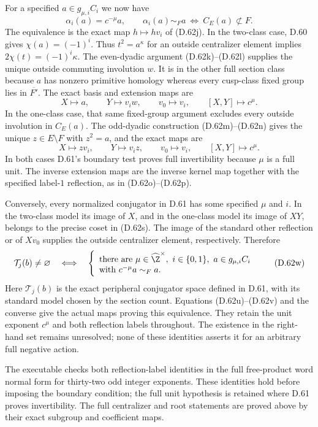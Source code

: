 For a specified $a\in g_{\mu,i}C_i$ we now have
\[
 \alpha_i(a)=c^{-\mu}a,\qquad
 \alpha_i(a)\sim_F a
       \ \Longleftrightarrow\
                 C_E(a)\not\subset F.                  \tag{D.62t}
\]
The equivalence is the exact map $h\mapsto hv_i$
of (D.62j). In the two-class case, D.60 gives
$\chi(a)=(-1)^i$. Thus $t^2=a^\kappa$ for an
outside centralizer element implies
$2\chi(t)=(-1)^i\kappa$.
The even-dyadic argument (D.62k)--(D.62l) supplies
the unique outside commuting involution $w$.
It is in the other full section class because
$a$ has nonzero primitive homology whereas
every cusp-class fixed group lies in
$\overline{F'}$. The exact basis and extension maps are
\[
 X\longmapsto a,\qquad Y\longmapsto v_iw,\qquad
 v_0\longmapsto v_i,\qquad [X,Y]\longmapsto c^\mu.
                                                        \tag{D.62u}
\]
In the one-class case, that same fixed-group
argument excludes every outside involution in
$C_E(a)$. The odd-dyadic construction
(D.62m)--(D.62n) gives the unique $z\in E\setminus F$
with $z^2=a$, and the exact maps are
\[
 X\longmapsto zv_i,\qquad Y\longmapsto v_i z,\qquad
 v_0\longmapsto v_i,\qquad [X,Y]\longmapsto c^\mu.
                                                        \tag{D.62v}
\]
In both cases D.61's boundary test proves full
invertibility because $\mu$ is a full unit.
The inverse extension maps are the inverse kernel
map together with the specified label-$1$ reflection,
as in (D.62o)--(D.62p).

Conversely, every normalized conjugator in D.61
has some specified $\mu$ and $i$. In the two-class
model its image of $X$, and in the one-class model
its image of $XY$, belongs to the precise coset
in (D.62s). The image of the standard other
reflection or of $Xv_0$ supplies the outside
centralizer element, respectively. Therefore
\[
 \mathcal T_j(b)\ne\varnothing
 \quad\Longleftrightarrow\quad
 \left\{\begin{array}{l}
 \text{there are }\mu\in\widehat\Z^\times,\ i\in\{0,1\},
       \ a\in g_{\mu,i}C_i\\
 \text{with }c^{-\mu}a\sim_F a .
 \end{array}\right.
                                                        \tag{D.62w}
\]
Here $\mathcal T_j(b)$ is the exact peripheral
conjugator space defined in D.61, with its standard
model chosen by the section count. Equations
(D.62u)--(D.62v) and the converse give the actual
maps proving this equivalence. They retain the
unit exponent $c^\mu$ and both reflection labels
throughout. The existence in the right-hand set
remains unresolved; none of these identities
asserts it for an arbitrary full negative action.

The executable
checks both reflection-label identities in the full
free-product word normal form for thirty-two odd
integer exponents. These identities hold before
imposing the boundary condition; the full unit
hypothesis is retained where D.61 proves invertibility.
The full centralizer and root statements are proved
above by their exact subgroup and coefficient maps.
